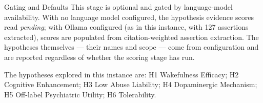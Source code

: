 \documentclass[
  ignorenonframetext,
]{beamer}
\begin{document}
\begin{frame}[allowframebreaks]{Gating and Defaults}
\protect{}\label{gating-and-defaults}
This stage is optional and gated by language-model availability. With no
language model configured, the hypothesis evidence scores read
\emph{pending}; with Ollama configured (as in this instance, with 127
assertions extracted), scores are populated from citation-weighted
assertion extraction. The hypotheses themselves --- their names and
scope --- come from configuration and are reported regardless of whether
the scoring stage has run.

The hypotheses explored in this instance are: H1 Wakefulness Efficacy;
H2 Cognitive Enhancement; H3 Low Abuse Liability; H4 Dopaminergic
Mechanism; H5 Off-label Psychiatric Utility; H6 Tolerability.
\end{frame}
\end{document}
